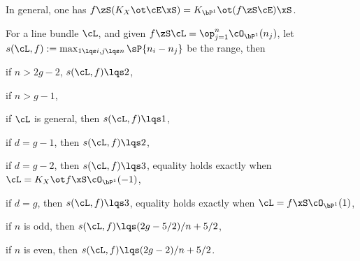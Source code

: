 \documentclass[a4paper, twoside]{article}
\begin{document}
\begin{thm}
	In general, one has $f\zS(K_{X}\ot\cE\xS)=K_{\bP^{1}}\ot(f\zS\cE)\xS$.

	For a line bundle $\cL$, and given $f\zS\cL=\op_{j=1}^{n}\cO_{\bP^{1}}(n_{j})$, let $s(\cL,f):=\max_{1\lqs i,j\lqs n}\sP{n_{i}-n_{j}}$ be the range, then
	\begin{itm}
		\item if $n>2g-2$, $s(\cL,f)\lqs2$,
		\item if $n>g-1$,
		\begin{itm}
			\item if $\cL$ is general, then $s(\cL,f)\lqs1$,
			\item if $d=g-1$, then $s(\cL,f)\lqs2$,
			\item if $d=g-2$, then $s(\cL,f)\lqs3$, equality holds exactly when $\cL=K_{X}\ot f\xS\cO_{\bP^{1}}(-1)$,
			\item if $d=g$, then $s(\cL,f)\lqs3$, equality holds exactly when $\cL=f\xS\cO_{\bP^{1}}(1)$,
		\end{itm}
		\item if $n$ is odd, then $s(\cL,f)\lqs (2g-5/2)/n+5/2$,
		\item if $n$ is even, then $s(\cL,f)\lqs(2g-2)/n+5/2$.
	\end{itm}
\end{thm}


\printref
\end{document}
